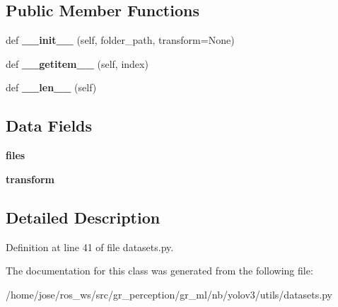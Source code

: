 \subsection*{Public Member Functions}
\begin{DoxyCompactItemize}
\item 
\mbox{\label{classutils_1_1datasets_1_1ImageFolder_a69c22dcb683a667ed369609780d9eba2}} 
def {\bfseries \+\_\+\+\_\+init\+\_\+\+\_\+} (self, folder\+\_\+path, transform=None)
\item 
\mbox{\label{classutils_1_1datasets_1_1ImageFolder_a962c7d29f9db832367acf0f296bf9492}} 
def {\bfseries \+\_\+\+\_\+getitem\+\_\+\+\_\+} (self, index)
\item 
\mbox{\label{classutils_1_1datasets_1_1ImageFolder_a5adb9466271478f7223fb9440dc117ce}} 
def {\bfseries \+\_\+\+\_\+len\+\_\+\+\_\+} (self)
\end{DoxyCompactItemize}
\subsection*{Data Fields}
\begin{DoxyCompactItemize}
\item 
\mbox{\label{classutils_1_1datasets_1_1ImageFolder_a8a1dc0f6904b00fdd9970d0b040311ad}} 
{\bfseries files}
\item 
\mbox{\label{classutils_1_1datasets_1_1ImageFolder_a62489b51a9f03d447f477a8c56678099}} 
{\bfseries transform}
\end{DoxyCompactItemize}


\subsection{Detailed Description}


Definition at line 41 of file datasets.\+py.



The documentation for this class was generated from the following file\+:\begin{DoxyCompactItemize}
\item 
/home/jose/ros\+\_\+ws/src/gr\+\_\+perception/gr\+\_\+ml/nb/yolov3/utils/datasets.\+py\end{DoxyCompactItemize}
